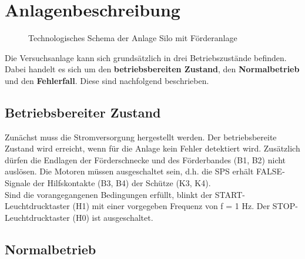 \section{Anlagenbeschreibung}

\begin{figure}[H]
   \centering
   \caption[Technologieschema]{Technologisches Schema der Anlage \glqq Silo mit Förderanlage\grqq{}}
   \label{fig:Bild2.1}
\end{figure}

Die Versuchsanlage kann sich grundsätzlich in drei Betriebszustände befinden. Dabei handelt es sich um den \textbf{betriebsbereiten Zustand}, den \textbf{Normalbetrieb} und den \textbf{Fehlerfall}. Diese sind nachfolgend beschrieben.

\subsection{Betriebsbereiter Zustand}

Zunächst muss die Stromversorgung hergestellt werden. Der betriebsbereite Zustand wird erreicht, wenn für die Anlage kein Fehler detektiert wird. Zusätzlich dürfen die Endlagen der Förderschnecke und des Förderbandes (B1, B2) nicht auslösen. Die Motoren müssen ausgeschaltet sein, d.h. die SPS erhält FALSE-Signale der Hilfskontakte (B3, B4) der Schütze (K3, K4).\\
Sind die vorangegangenen Bedingungen erfüllt, blinkt der START-Leuchtdrucktaster (H1) mit einer vorgegeben Frequenz von f = 1 Hz. Der STOP-Leuchtdrucktaster (H0) ist ausgeschaltet.

\subsection{Normalbetrieb}

